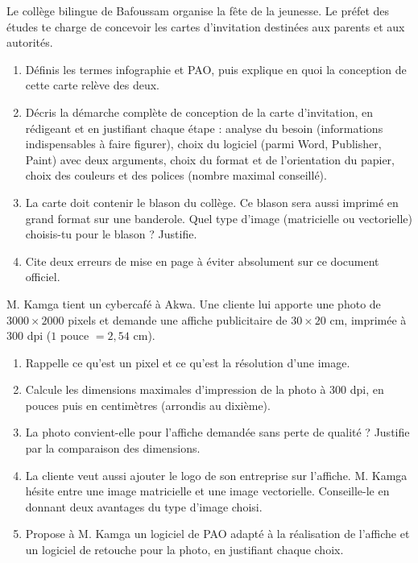 \documentclass[11pt]{article}
\newcommand{\cle}[1]{{\popxbold\color{popdark}#1}}
\newcounter{popsec}
\newcounter{popsub}
\newcommand{\courssub}[1]{%
  \stepcounter{popsub}%
  \par\vspace{9pt}\noindent{\popxbold\fontsize{11.5}{13}\selectfont\color{popink}{\color{poporange}\thepopsec.\thepopsub}\hspace{6pt}#1}\par\nopagebreak\vspace{4pt}
}
\begin{document}
\courssub{Je me prépare au BEPC}

\begin{exercice}
Le collège bilingue de Bafoussam organise la fête de la jeunesse. Le préfet des études te charge de concevoir les cartes d'invitation destinées aux parents et aux autorités.
\begin{enumerate}
\item Définis les termes \cle{infographie} et \cle{PAO}, puis explique en quoi la conception de cette carte relève des deux.
\item Décris la démarche complète de conception de la carte d'invitation, en rédigeant et en justifiant chaque étape : analyse du besoin (informations indispensables à faire figurer), choix du logiciel (parmi Word, Publisher, Paint) avec deux arguments, choix du format et de l'orientation du papier, choix des couleurs et des polices (nombre maximal conseillé).
\item La carte doit contenir le blason du collège. Ce blason sera aussi imprimé en grand format sur une banderole. Quel type d'image (matricielle ou vectorielle) choisis-tu pour le blason ? Justifie.
\item Cite deux erreurs de mise en page à éviter absolument sur ce document officiel.
\end{enumerate}
\end{exercice}

\begin{exercice}
M. Kamga tient un cybercafé à Akwa. Une cliente lui apporte une photo de $3000 \times 2000$ pixels et demande une affiche publicitaire de $30 \times 20$ cm, imprimée à $300$ dpi ($1$ pouce $= 2,54$ cm).
\begin{enumerate}
\item Rappelle ce qu'est un pixel et ce qu'est la résolution d'une image.
\item Calcule les dimensions maximales d'impression de la photo à $300$ dpi, en pouces puis en centimètres (arrondis au dixième).
\item La photo convient-elle pour l'affiche demandée sans perte de qualité ? Justifie par la comparaison des dimensions.
\item La cliente veut aussi ajouter le logo de son entreprise sur l'affiche. M. Kamga hésite entre une image matricielle et une image vectorielle. Conseille-le en donnant deux avantages du type d'image choisi.
\item Propose à M. Kamga un logiciel de PAO adapté à la réalisation de l'affiche et un logiciel de retouche pour la photo, en justifiant chaque choix.
\end{enumerate}
\end{exercice}
\end{document}
